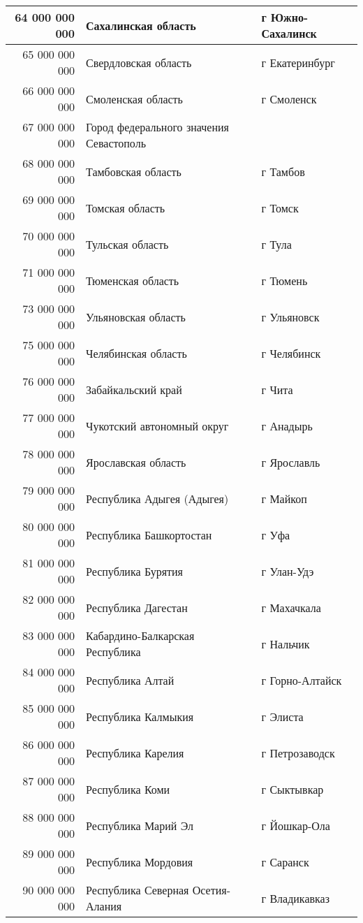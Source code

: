 \documentclass[10pt, a4paper, titlepage]{article}
\begin{document}
\begin{center}
\begin{longtable}{|r|p{}|p{}|}
    64 000 000 000 & Сахалинская область & г Южно-Сахалинск \\ \hline
    65 000 000 000 & Свердловская область & г Екатеринбург \\ \hline
    66 000 000 000 & Смоленская область & г Смоленск \\ \hline
    67 000 000 000 & Город федерального значения Севастополь & \\ \hline
    68 000 000 000 & Тамбовская область & г Тамбов \\ \hline
    69 000 000 000 & Томская область & г Томск \\ \hline
    70 000 000 000 & Тульская область & г Тула \\ \hline
    71 000 000 000 & Тюменская область & г Тюмень \\ \hline
    73 000 000 000 & Ульяновская область & г Ульяновск \\ \hline
    75 000 000 000 & Челябинская область & г Челябинск \\ \hline
    76 000 000 000 & Забайкальский край & г Чита \\ \hline
    77 000 000 000 & Чукотский автономный округ & г Анадырь \\ \hline
    78 000 000 000 & Ярославская область & г Ярославль \\ \hline
    79 000 000 000 & Республика Адыгея (Адыгея) & г Майкоп \\ \hline
    80 000 000 000 & Республика Башкортостан & г Уфа \\ \hline
    81 000 000 000 & Республика Бурятия & г Улан-Удэ \\ \hline
    82 000 000 000 & Республика Дагестан & г Махачкала \\ \hline
    83 000 000 000 & Кабардино-Балкарская Республика & г Нальчик \\ \hline
    84 000 000 000 & Республика Алтай & г Горно-Алтайск \\ \hline
    85 000 000 000 & Республика Калмыкия & г Элиста \\ \hline
    86 000 000 000 & Республика Карелия & г Петрозаводск \\ \hline
    87 000 000 000 & Республика Коми & г Сыктывкар \\ \hline
    88 000 000 000 & Республика Марий Эл & г Йошкар-Ола \\ \hline
    89 000 000 000 & Республика Мордовия & г Саранск \\ \hline
    90 000 000 000 & Республика Северная Осетия-Алания & г Владикавказ \\ \hline

\end{longtable}
\end{center}
\end{document}
